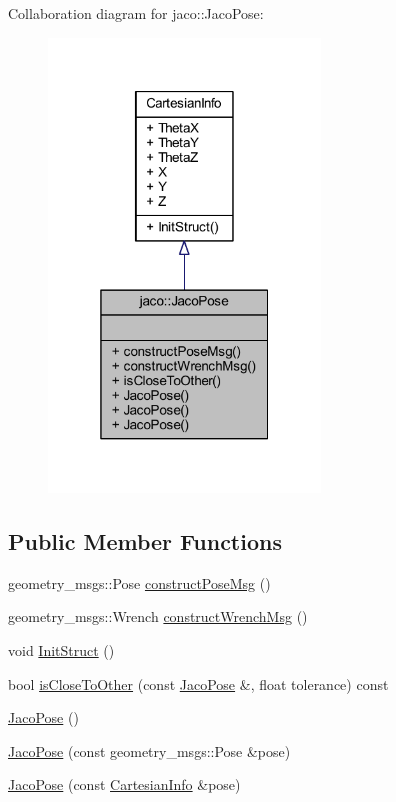 Collaboration diagram for jaco\+:\+:Jaco\+Pose\+:
\nopagebreak
\begin{figure}[H]
\begin{center}
\leavevmode
\includegraphics[width=205pt]{d2/ddf/classjaco_1_1JacoPose__coll__graph}
\end{center}
\end{figure}
\subsection*{Public Member Functions}
\begin{DoxyCompactItemize}
\item 
geometry\+\_\+msgs\+::\+Pose \hyperlink{classjaco_1_1JacoPose_a9f2e68a94240e365afefd84d92f5a132}{construct\+Pose\+Msg} ()
\item 
geometry\+\_\+msgs\+::\+Wrench \hyperlink{classjaco_1_1JacoPose_a0ce9524097d0c974210ab20e63049b1c}{construct\+Wrench\+Msg} ()
\item 
void \hyperlink{structCartesianInfo_a6d47623939d86124525ab4c8f7a2b8e9}{Init\+Struct} ()
\item 
bool \hyperlink{classjaco_1_1JacoPose_aed0e2dcb5cc3bc8315a2988bba51d513}{is\+Close\+To\+Other} (const \hyperlink{classjaco_1_1JacoPose}{Jaco\+Pose} \&, float tolerance) const 
\item 
\hyperlink{classjaco_1_1JacoPose_afadf92820c16343650a71572acf9c402}{Jaco\+Pose} ()
\item 
\hyperlink{classjaco_1_1JacoPose_a40acc797871a6bf6870ed0dd66ec75d7}{Jaco\+Pose} (const geometry\+\_\+msgs\+::\+Pose \&pose)
\item 
\hyperlink{classjaco_1_1JacoPose_a237eff1d503ce1020aad353febd51609}{Jaco\+Pose} (const \hyperlink{structCartesianInfo}{Cartesian\+Info} \&pose)
\end{DoxyCompactItemize}
